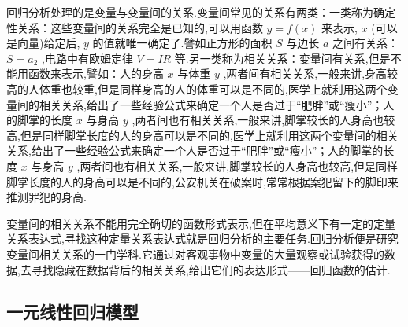 回归分析处理的是变量与变量间的关系.变量间常见的关系有两类：一类称为确定性关系：这些变量间的关系完全是已知的,可以用函数 $ y=f(x) $ 来表示, $ x $ (可以是向量)给定后, $ y $ 的值就唯一确定了.譬如正方形的面积 $ S $ 与边长 $ a $ 之间有关系： $ S=a_2 $ ,电路中有欧姆定律 $ V=IR $ 等.另一类称为相关关系：变量间有关系,但是不能用函数来表示,譬如：人的身高 $ x $ 与体重 $ y $ ,两者间有相关关系,一般来讲,身高较高的人体重也较重,但是同样身高的人的体重可以是不同的,医学上就利用这两个变量间的相关关系,给出了一些经验公式来确定一个人是否过于“肥胖”或“瘦小”；人的脚掌的长度 $  x $ 与身高 $  y $ ,两者间也有相关关系,一般来讲,脚掌较长的人身高也较高,但是同样脚掌长度的人的身高可以是不同的,医学上就利用这两个变量间的相关关系,给出了一些经验公式来确定一个人是否过于“肥胖”或“瘦小”；人的脚掌的长度 $ x $   与身高 $ y $ ,两者间也有相关关系,一般来讲,脚掌较长的人身高也较高,但是同样脚掌长度的人的身高可以是不同的,公安机关在破案时,常常根据案犯留下的脚印来推测罪犯的身高.

变量间的相关关系不能用完全确切的函数形式表示,但在平均意义下有一定的定量关系表达式,寻找这种定量关系表达式就是回归分析的主要任务.回归分析便是研究变量间相关关系的一门学科.它通过对客观事物中变量的大量观察或试验获得的数据,去寻找隐藏在数据背后的相关关系,给出它们的表达形式——回归函数的估计.

\subsection{一元线性回归模型}\label{sub:8.4.2}


